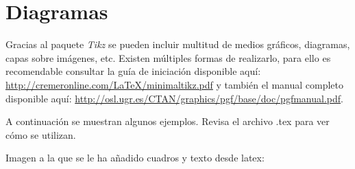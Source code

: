 \section{Diagramas}
Gracias al paquete \textit{Tikz} se pueden incluir multitud de medios gráficos, diagramas, capas sobre imágenes, etc.
Existen múltiples formas de realizarlo, para ello es recomendable consultar la guía de iniciación disponible aquí: \url{http://cremeronline.com/LaTeX/minimaltikz.pdf} y también el manual completo disponible aquí: \url{http://osl.ugr.es/CTAN/graphics/pgf/base/doc/pgfmanual.pdf}.
\\
\par A continuación se muestran algunos ejemplos. Revisa el archivo .tex para ver cómo se utilizan.
\\
\par Imagen a la que se le ha añadido cuadros y texto desde latex:
